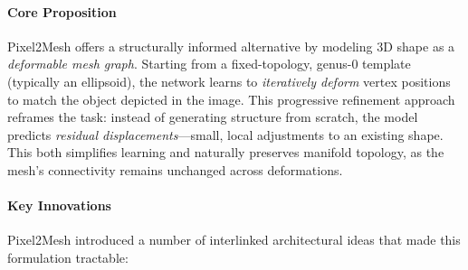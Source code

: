 \paragraph{Core Proposition}
Pixel2Mesh offers a structurally informed alternative by modeling 3D shape as a \emph{deformable mesh graph}. Starting from a fixed-topology, genus-0 template (typically an ellipsoid), the network learns to \emph{iteratively deform} vertex positions to match the object depicted in the image. This progressive refinement approach reframes the task: instead of generating structure from scratch, the model predicts \emph{residual displacements}—small, local adjustments to an existing shape. This both simplifies learning and naturally preserves manifold topology, as the mesh’s connectivity remains unchanged across deformations.

\paragraph{Key Innovations}
Pixel2Mesh introduced a number of interlinked architectural ideas that made this formulation tractable:
